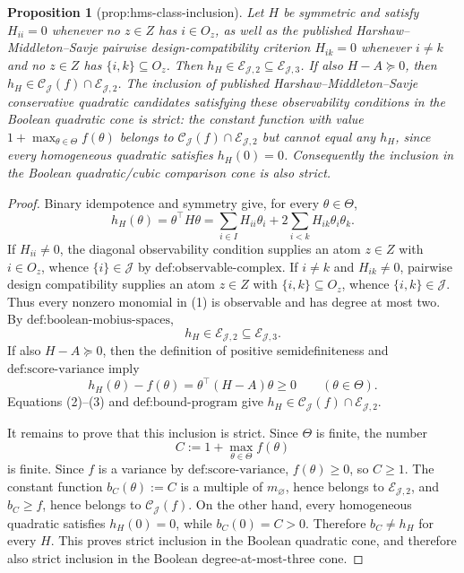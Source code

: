 \documentclass{article}
\newtheorem{proposition}{Proposition}
\begin{document}
\begin{proposition}[prop:hms-class-inclusion]\label{prop:hms-class-inclusion}
Let \(H\) be symmetric and satisfy \(H_{ii}=0\) whenever no \(z\in Z\) has \(i\in O_z\), as well as the published Harshaw--Middleton--Savje pairwise design-compatibility criterion \(H_{ik}=0\) whenever \(i\ne k\) and no \(z\in Z\) has \(\{i,k\}\subseteq O_z\). Then \(h_H\in\mathcal E_{\mathcal J,2}\subseteq\mathcal E_{\mathcal J,3}\). If also \(H-A\succeq0\), then \(h_H\in\mathcal C_{\mathcal J}(f)\cap\mathcal E_{\mathcal J,2}\). The inclusion of published Harshaw--Middleton--Savje conservative quadratic candidates satisfying these observability conditions in the Boolean quadratic cone is strict: the constant function with value \(1+\max_{\theta\in\Theta}f(\theta)\) belongs to \(\mathcal C_{\mathcal J}(f)\cap\mathcal E_{\mathcal J,2}\) but cannot equal any \(h_H\), since every homogeneous quadratic satisfies \(h_H(0)=0\). Consequently the inclusion in the Boolean quadratic/cubic comparison cone is also strict.
\end{proposition}
\begin{proof}
Binary idempotence and symmetry give, for every \(\theta\in\Theta\),
\[
h_H(\theta)=\theta^\top H\theta
=\sum_{i\in I}H_{ii}\theta_i+2\sum_{i<k}H_{ik}\theta_i\theta_k. \tag{1}
\]
If \(H_{ii}\ne0\), the diagonal observability condition supplies an atom \(z\in Z\) with \(i\in O_z\), whence \(\{i\}\in\mathcal J\) by \(\text{def:observable-complex}\).  If \(i\ne k\) and \(H_{ik}\ne0\), pairwise design compatibility supplies an atom \(z\in Z\) with \(\{i,k\}\subseteq O_z\), whence \(\{i,k\}\in\mathcal J\).  Thus every nonzero monomial in (1) is observable and has degree at most two.  By \(\text{def:boolean-mobius-spaces}\),
\[
h_H\in\mathcal E_{\mathcal J,2}\subseteq\mathcal E_{\mathcal J,3}. \tag{2}
\]
If also \(H-A\succeq0\), then the definition of positive semidefiniteness and \(\text{def:score-variance}\) imply
\[
h_H(\theta)-f(\theta)=\theta^\top(H-A)\theta\ge0
\qquad(\theta\in\Theta). \tag{3}
\]
Equations (2)--(3) and \(\text{def:bound-program}\) give
\(h_H\in\mathcal C_{\mathcal J}(f)\cap\mathcal E_{\mathcal J,2}\).

It remains to prove that this inclusion is strict.  Since \(\Theta\) is finite, the number
\[
C:=1+\max_{\theta\in\Theta}f(\theta)
\]
is finite.  Since \(f\) is a variance by \(\text{def:score-variance}\), \(f(\theta)\ge0\), so \(C\ge1\).  The constant function \(b_C(\theta):=C\) is a multiple of \(m_\varnothing\), hence belongs to \(\mathcal E_{\mathcal J,2}\), and \(b_C\ge f\), hence belongs to \(\mathcal C_{\mathcal J}(f)\).  On the other hand, every homogeneous quadratic satisfies \(h_H(0)=0\), while \(b_C(0)=C>0\).  Therefore \(b_C\ne h_H\) for every \(H\).  This proves strict inclusion in the Boolean quadratic cone, and therefore also strict inclusion in the Boolean degree-at-most-three cone.
\end{proof}
\end{document}
